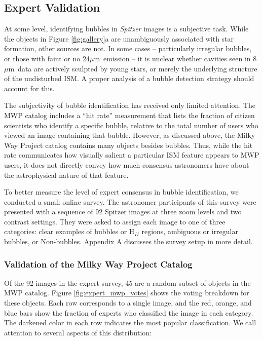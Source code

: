 \documentclass[preprint]{aastex}
\newcommand{\um}[0]{$\mu$m}
\begin{document}
\subsection{Expert Validation}

At some level, identifying bubbles in \textit{Spitzer} images is a subjective task. While the objects in Figure \ref{fig:gallery}a are unambiguously associated with star formation, other sources are not. In some cases -- particularly irregular bubbles, or those with faint or no 24\um\, emission -- it is unclear whether cavities seen in 8 \um\, data are actively sculpted by young stars, or merely the underlying structure of the undisturbed ISM. A proper analysis of a bubble detection strategy should account for this.

The subjectivity of bubble identification has received only limited attention. The MWP catalog includes a ``hit rate'' measurement that lists the fraction of citizen scientists who identify a specific bubble, relative to the total number of users who viewed an image containing that bubble. However, as discussed above, the Milky Way Project catalog contains many objects besides bubbles. Thus, while the hit rate communicates how visually salient a particular ISM feature appears to MWP users, it does not directly convey how much consensus astronomers have about the astrophysical nature of that feature.

To better measure the level of expert consensus in bubble identification, we conducted a small online survey. The astronomer participants of this survey were presented with a sequence of 92 Spitzer images at three zoom levels and two contrast settings. They were asked to assign each image to one of three categories: clear examples of bubbles or H$_{II}$ regions, ambiguous or irregular bubbles, or Non-bubbles. Appendix A discusses the survey setup in more detail.

\subsubsection{Validation of the Milky Way Project Catalog}
Of the 92 images in the expert survey, 45 are a random subset of objects in the MWP catalog. Figure \ref{fig:expert_mwp_votes} shows the voting breakdown for these objects. Each row corresponds to a single image, and the red, orange, and blue bars show the fraction of experts who classified the image in each category. The darkened color in each row indicates the most popular classification.  We call attention to several aspects of this distribution: 
\end{document}
